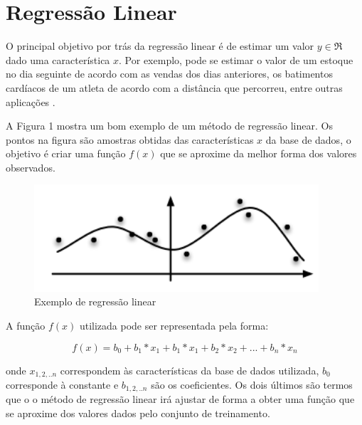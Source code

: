 \section{Regressão Linear}
O principal objetivo por trás da regressão linear é de estimar um valor $y \in \Re$ dado uma característica $x$.
Por exemplo, pode se estimar o valor de um estoque no dia seguinte de acordo com as vendas dos dias anteriores, os batimentos cardíacos de um atleta de acordo com a distância que percorreu, entre outras aplicações \cite{smola2008introduction}. 
 
 A Figura 1 mostra um bom exemplo de um método de regressão linear. Os pontos na figura são amostras obtidas das características $x$ da base de dados, o objetivo é criar uma função $f(x)$ que se aproxime da melhor forma dos valores observados.
\begin{figure}[H]
	\label{reg}
	\begin{centering}
		\includegraphics[width = 300pt]{img/regressao.png}
		\caption{Exemplo de regressão linear}
	\end{centering}	
	
\end{figure}

A função $f(x)$ utilizada pode ser representada pela forma:

$$ f(x) = b_0 + b_1*x_1 + b_1*x_1 + b_2*x_2 + ... + b_n*x_n $$

onde $x_{1,2,..n}$ correspondem às características da base de dados utilizada, $b_0$ corresponde à constante e $b_{1,2,..n}$ são os coeficientes. Os dois últimos são termos que o o método de regressão linear irá ajustar de forma a obter uma função que se aproxime dos valores dados pelo conjunto de treinamento.

